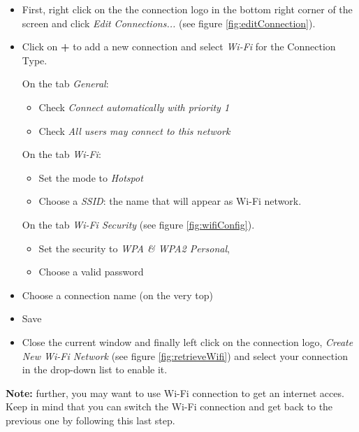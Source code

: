 \begin{itemize}
	\item First, right click on the the connection logo in the bottom right corner of the
screen and click \emph{Edit Connections...} (see figure \ref{fig:editConnection}). 
	\item Click on  \textbf{+}  to add a new connection and select \emph{Wi-Fi} for the 
		Connection Type. 

		On the tab \emph{General}:
		\begin{itemize}
			\item Check \emph{Connect automatically with priority 1}
			\item Check \emph{All users may connect to this network}
		\end{itemize}

		On the tab \emph{Wi-Fi}:
		\begin{itemize}
			\item Set the mode to \emph{Hotspot}
			\item Choose a \emph{SSID}: the name that will appear as Wi-Fi network. 
		\end{itemize}

		On the tab \emph{Wi-Fi Security} (see figure \ref{fig:wifiConfig}).
		\begin{itemize}
			\item Set the security to \emph{WPA \& WPA2 Personal}, 
			\item Choose a valid password
		\end{itemize}
		\item Choose a connection name (on the very top)
		\item Save 
		\item Close the current window and finally left click on 
			the connection logo, \emph{Create New Wi-Fi Network} 
			(see figure \ref{fig:retrieveWifi})
			and select your connection in the drop-down list to enable it.
			
\end{itemize}


\textbf{Note:} further, you may want to use Wi-Fi connection to get an
internet acces. Keep in mind that you can switch the Wi-Fi connection and 
get back to the previous one by following this last step.


